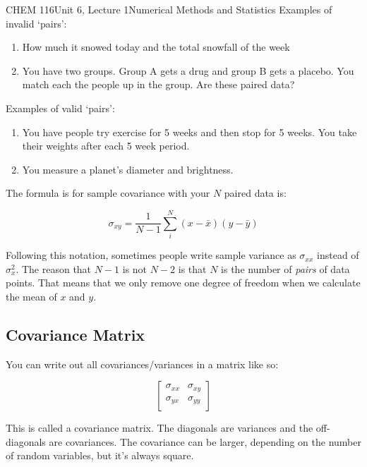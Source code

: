 \documentclass{article}
\begin{document}
\begin{tdoc}{CHEM 116}{Unit 6, Lecture 1}{Numerical Methods and Statistics}
Examples of invalid `pairs':

\begin{enumerate}

\item How much it snowed today and the total snowfall of the week

\item You have two groups. Group A gets a drug and group B gets a
  placebo. You match each the people up in the group. Are these paired data?

\end{enumerate}

Examples of valid `pairs':

\begin{enumerate}

  \item You have people try exercise for 5 weeks and then stop for 5
    weeks. You take their weights after each 5 week period.

    \item You measure a planet's diameter and brightness.

\end{enumerate}


The formula is for sample covariance with your $N$ paired data is:

\begin{equation}
  \sigma_{xy}= \frac{1}{N - 1} \sum_i^N (x - \bar{x})(y - \bar{y})
\end{equation}

Following this notation, sometimes people write sample variance as
$\sigma_{xx}$ instead of $\sigma_x^2$. The reason that $N - 1$ is not
$N - 2$ is that $N$ is the number of {\it pairs} of data points. That
means that we only remove one degree of freedom when we calculate the
mean of $x$ and $y$.

\subsection{Covariance Matrix}

You can write out all covariances/variances in a matrix like so:

\[
\left[\begin{array}{lr}
\sigma_{xx} & \sigma_{xy}\\
\sigma_{yx} & \sigma_{yy}\\
  \end{array}\right]
\]

This is called a covariance matrix. The diagonals are variances and
the off-diagonals are covariances. The covariance can be larger,
depending on the number of random variables, but it's always square.



\end{tdoc}
\end{document}
